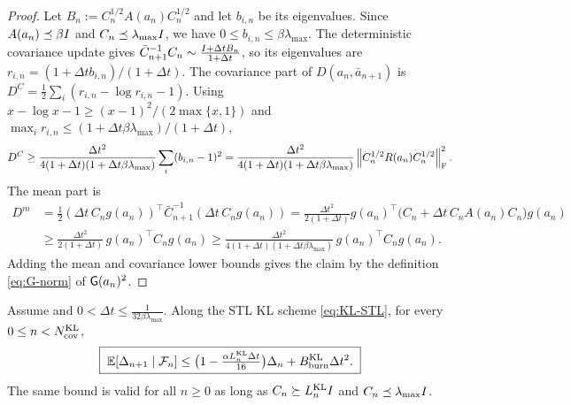 \begin{proof}
Let $B_n:=C_n^{1/2}A(a_n)C_n^{1/2}$ and let $b_{i,n}$ be its eigenvalues. Since
$A(a_n)\preceq\beta I$ and $C_n\preceq\lambda_{\max}I$, we have
$0\leq b_{i,n}\leq\beta\lambda_{\max}$. The deterministic covariance update gives
$\bar C_{n+1}^{-1}C_n\sim\tfrac{I+\Delta t B_n}{1+\Delta t}$,
so its eigenvalues are $r_{i,n}=(1+\Delta t b_{i,n})/(1+\Delta t)$. The covariance part of
$D(a_n,\bar a_{n+1})$ is $D^C=\tfrac12\sum_i(r_{i,n}-\log r_{i,n}-1)$.
Using $x-\log x-1\geq (x-1)^2/(2\max\{x,1\})$ and
$\max_i r_{i,n}\leq (1+\Delta t\beta\lambda_{\max})/(1+\Delta t)$,
\[
    D^C
    \geq
    \frac{\Delta t^2}{4(1+\Delta t)(1+\Delta t\beta\lambda_{\max})}
    \sum_i(b_{i,n}-1)^2
    =
    \frac{\Delta t^2}{4(1+\Delta t)(1+\Delta t\beta\lambda_{\max})}
    \left\lVert C_n^{1/2}R(a_n)C_n^{1/2}\right\rVert_{\mathrm{F}}^2 .
\]
The mean part is
\[
\begin{aligned}
    D^m
    &=
    \frac12(\Delta t\,C_ng(a_n))^\top
    \bar C_{n+1}^{-1}
    (\Delta t\,C_ng(a_n))
    =
    \frac{\Delta t^2}{2(1+\Delta t)}
    g(a_n)^\top\bigl(C_n+\Delta t\,C_nA(a_n)C_n\bigr)g(a_n)\\
    &\geq
    \frac{\Delta t^2}{2(1+\Delta t)}\,g(a_n)^\top C_ng(a_n)
    \geq
    \frac{\Delta t^2}{4(1+\Delta t)(1+\Delta t\beta\lambda_{\max})}\,
    g(a_n)^\top C_ng(a_n).
\end{aligned}
\]
Adding the mean and covariance lower bounds gives the claim by the definition
\eqref{eq:G-norm} of $\mathsf{G}(a_n)^2$.
\end{proof}

\begin{lemma}
\label{lem:KL-STL-burnin-descent}
Assume  and
$0<\Delta t\leq\frac1{32\beta\lambda_{\max}}$.
Along the STL KL scheme \eqref{eq:KL-STL}, for every $0\leq n<N_{\mathrm{cov}}^{\mathrm{KL}}$,
\[
    \boxed{\;
    \mathbb{E}[\Delta_{n+1}\mid\mathcal{F}_n]
    \leq
    \bigl(1-\tfrac{\alpha L_n^{\mathrm{KL}}\Delta t}{16}\bigr)\Delta_n
    +
    B_{\mathrm{burn}}^{\mathrm{KL}}\Delta t^2 .
    \;}
\]
The same bound is valid for all $n\geq0$ as long as
$C_n\succeq L_n^{\mathrm{KL}}I$ and $C_n\preceq\lambda_{\max}I$.
\end{lemma}

